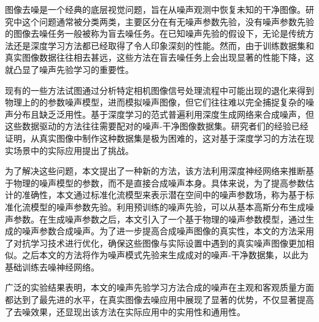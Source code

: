 图像去噪是一个经典的底层视觉问题，旨在从噪声观测中恢复未知的干净图像。研究中这个问题通常被分类两类，主要区分在有无噪声参数先验，没有噪声参数先验的图像去噪任务一般被称为盲去噪任务。在已知噪声先验的假设下，无论是传统方法还是深度学习方法都已经取得了令人印象深刻的性能。然而，由于训练数据集和真实图像数据往往相去甚远，这些方法在盲去噪任务上会出现显著的性能下降，这就凸显了噪声先验学习的重要性。

现有的一些方法试图通过分析特定相机图像信号处理流程中可能出现的退化来得到物理上的的参数噪声模型，进而模拟噪声图像，但它们往往难以完全捕捉复杂的噪声分布且缺乏泛用性。基于深度学习的范式普遍利用深度生成网络来合成噪声，但这些数据驱动的方法往往需要配对的噪声-干净图像数据集。研究者们的经验已经证明，从真实图像中制作这种数据集是极为困难的，这对基于深度学习的方法在现实场景中的实际应用提出了挑战。

为了解决这些问题，本文提出了一种新的方法，该方法利用深度神经网络来推断基于物理的噪声模型的参数，而不是直接合成噪声本身。具体来说，为了提高参数估计的准确性，本文通过标准化流模型来表示潜在空间中的噪声参数场，称为基于标准化流模型的噪声参数先验。利用预训练的噪声先验，可以从基本高斯分布生成噪声参数。在生成噪声参数之后，本文引入了一个基于物理的噪声参数模型，通过生成的噪声参数合成噪声。为了进一步提高合成噪声图像的真实性，本文的方法采用了对抗学习技术进行优化，确保这些图像与实际设置中遇到的真实噪声图像更加相似。之后本文的方法将作为噪声模式先验来生成成对的噪声-干净数据集，以此为基础训练去噪神经网络。

广泛的实验结果表明，本文的噪声先验学习方法合成的噪声在主观和客观质量方面都达到了最先进的水平，在真实图像去噪应用中展现了显著的优势，不仅显著提高了去噪效果，还显现出该方法在实际应用中的实用性和通用性。
